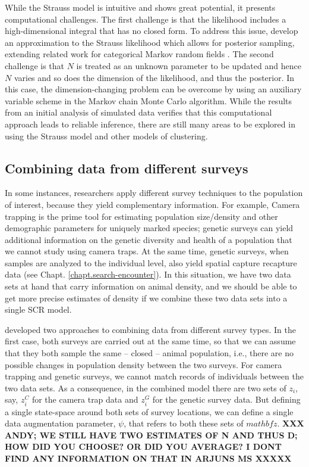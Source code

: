 While the Strauss model is intuitive and shows great potential, it
presents computational challenges.  The first challenge is that the
likelihood includes a high-dimensional integral that has no closed
form.  To address this issue, \citet{rreich_etal:2012} develop an approximation to the
Strauss likelihood which allows for posterior sampling, extending
related work for categorical Markov random fields
\citep{green_richardson:2002,smith_smith:2006}.  The second challenge
is that $N$ is treated as an unknown parameter to be updated and hence
$N$ varies and so does the dimension of the likelihood, and thus the
posterior.  In this case,  the dimension-changing
problem can be overcome by using an auxiliary variable scheme in the Markov chain Monte
Carlo algorithm.
While the results from an initial analysis of simulated data verifies that this computational
approach leads to reliable inference, there are still many areas to be explored in
using the Strauss model and other models of clustering.


\subsection{Combining data from different surveys}

In some instances, researchers apply different survey techniques to
the population of interest, because they yield complementary
information. For example, Camera trapping is the prime tool for
estimating population size/density and other demographic parameters
for uniquely marked species; genetic surveys can yield additional
information on the genetic diversity and health of a population that
we cannot study using camera traps. At the same time, genetic surveys,
when samples are analyzed to the individual level, also yield spatial
capture recapture data (see Chapt. \ref{chapt.search-encounter}). In
this situation, we have two data sets at hand that carry information
on animal density, and we should be able to get more precise estimates
of density if we combine these two data sets into a single SCR model.

\citet{gopalaswamy_etal:2012mee} developed two approaches to combining
data from different survey types. In the first case, both surveys are
carried out at the same time, so that we can assume that they both
sample the same -- closed -- animal population, i.e., there are no
possible changes in population density between the two surveys. For
camera trapping and genetic surveys, we cannot match records of
individuals between the two data sets. As a consequence, in the
combined model there are two sets of $z_i$, say, $z^{C}_{i}$ for the
camera trap data and $z^{G}_{i}$ for the genetic survey data. But
defining a single state-space around both sets of survey locations, we
can define a single data augmentation parameter, $\psi$, that refers to
both these sets of $mathbf{z}$.  {\bf XXX ANDY; WE STILL HAVE TWO ESTIMATES
OF N AND THUS D; HOW DID YOU CHOOSE? OR DID YOU AVERAGE? I DONT FIND
ANY INFORMATION ON THAT IN ARJUNS MS XXXXX}

